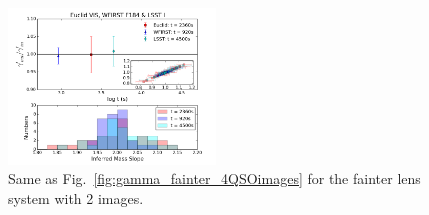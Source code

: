 \documentclass[a4paper,11pt]{article}
\begin{document}
{\begin{figure}
\begin{center}
\includegraphics[width=0.49\textwidth]{figures/gamma_hist_135949anti_2QSO_EWL.png}
\end{center}
\caption{Same as Fig.~\ref{fig:gamma_fainter_4QSOimages} for the fainter lens system with 2 images.
\label{fig:gamma_fainter_2QSOimages}}
\end{figure}

}
\end{document}
